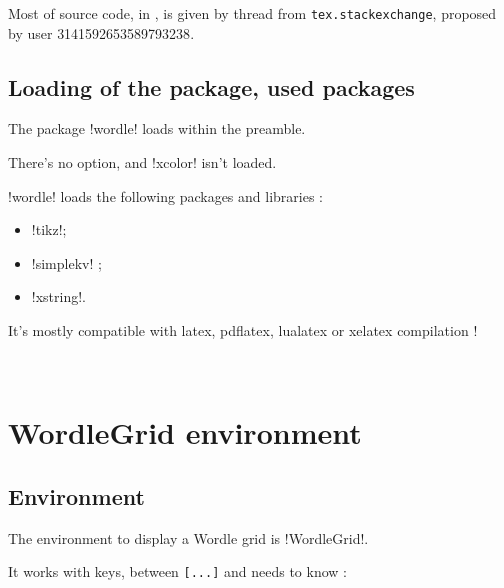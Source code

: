 \documentclass[english,a4paper,11pt]{article}
\begin{document}
{\begin{importantblock}
Most of source code, in , is given by thread from \texttt{tex.stackexchange}, proposed by user \textsf{3141592653589793238}.
\end{importantblock}

\subsection{Loading of the package, used packages}

\begin{importantblock}
The package \packagetex!wordle! loads within the preamble.

There's no option, and \packagetex!xcolor! isn't loaded.
\end{importantblock}


\begin{noteblock}
\packagetex!wordle! loads the following packages and libraries :

\begin{itemize}
	\item \packagetex!tikz!;
	\item \packagetex!simplekv! ;
	\item \packagetex!xstring!.
\end{itemize}

It’s mostly compatible with \textsf{latex}, \textsf{pdflatex}, \textsf{lualatex} or \textsf{xelatex} compilation !
\end{noteblock}

\vfill~

\pagebreak

\section{WordleGrid environment}

\subsection{Environment}

\begin{cautionblock}
The environment to display a Wordle grid is \packagetex!WordleGrid!.

It works with keys, between \texttt{[...]} and needs to know :


\end{cautionblock}}
\end{document}
